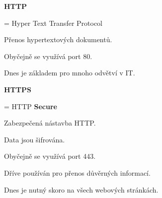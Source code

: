 \documentclass[aspectratio=1610]{beamer}
\begin{document}
\begin{frame}
    \begin{multicols}{2}
        \centering
        
        \begin{cardTiny}
            \textbf{HTTP}
        
            \begin{flushleft}
            = Hyper Text Transfer Protocol

            \vspace{2ex}
            Přenos hypertextových dokumentů.

            Obyčejně se využívá port 80.
            
            \vspace{2ex}
            Dnes je základem pro mnoho odvětví v IT.
            \end{flushleft}
        \end{cardTiny}

        \begin{cardTiny}
            \textbf{HTTPS}
            
            \begin{flushleft}
            = HTTP \textbf{Secure}

            \vspace{2ex}
            Zabezpečená nástavba HTTP.
            
            Data jsou šifrována.

            Obyčejně se využívá port 443.
            
            \vspace{2ex}
            Dříve používán pro přenos důvěrných informací.

            Dnes je nutný skoro na všech webových stránkách.
            \end{flushleft}
        \end{cardTiny}
    \end{multicols}
\end{frame}
\end{document}

